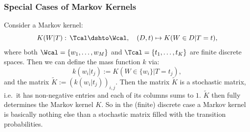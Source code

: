 \subsubsection{Special Cases of Markov Kernels}


\begin{Eg}
    Consider a Markov kernel:
    \[K(W|T):\, \Tcal \dshto \Wcal,\quad (D,t) \mapsto K(W \in D|T=t),  \]
    where both $\Wcal=\{w_1,\dots,w_M\}$ and $\Tcal=\{t_1,\dots,t_K\}$ are finite discrete spaces.
    Then we can define the mass function $k$ via:
    \[  k(w_i|t_j) := K(W \in \{w_i\}|T=t_j),  \]
    and the matrix $\tilde K:=(k(w_i|t_j))_{i,j}$.
    Then the matrix $\tilde K$ is a stochastic matrix, i.e.\ it has non-negative entries and each of its columns sums to $1$. 
    $\tilde K$ then fully determines the Markov kernel $K$.
    So in the (finite) discrete case a Markov kernel is basically nothing else than a stochastic matrix filled with the transition probabilities.
\end{Eg}

